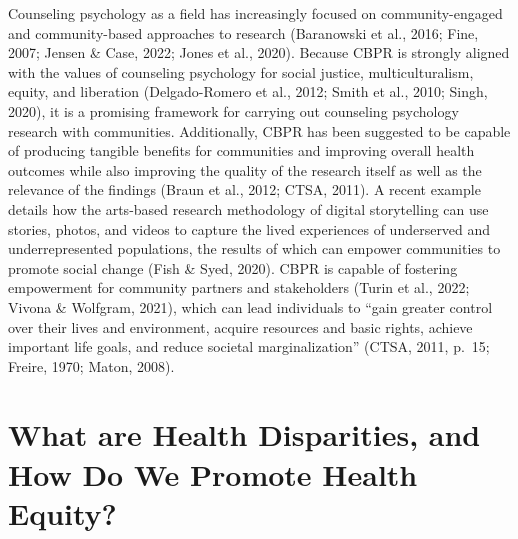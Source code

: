 \documentclass[
  11pt,
]{book}
\begin{document}
Counseling psychology as a field has increasingly focused on community-engaged and community-based approaches to research (Baranowski et al., 2016; Fine, 2007; Jensen \& Case, 2022; Jones et al., 2020). Because CBPR is strongly aligned with the values of counseling psychology for social justice, multiculturalism, equity, and liberation (Delgado-Romero et al., 2012; Smith et al., 2010; Singh, 2020), it is a promising framework for carrying out counseling psychology research with communities. Additionally, CBPR has been suggested to be capable of producing tangible benefits for communities and improving overall health outcomes while also improving the quality of the research itself as well as the relevance of the findings (Braun et al., 2012; CTSA, 2011). A recent example details how the arts-based research methodology of digital storytelling can use stories, photos, and videos to capture the lived experiences of underserved and underrepresented populations, the results of which can empower communities to promote social change (Fish \& Syed, 2020). CBPR is capable of fostering empowerment for community partners and stakeholders (Turin et al., 2022; Vivona \& Wolfgram, 2021), which can lead individuals to ``gain greater control over their lives and environment, acquire resources and basic rights, achieve important life goals, and reduce societal marginalization'' (CTSA, 2011, p.~15; Freire, 1970; Maton, 2008).

\hypertarget{what-are-health-disparities-and-how-do-we-promote-health-equity}{%
\section{What are Health Disparities, and How Do We Promote Health Equity?}\label{what-are-health-disparities-and-how-do-we-promote-health-equity}}
\end{document}
